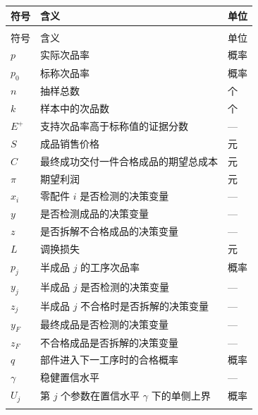 \documentclass[withoutpreface,bwprint]{cumcmthesis}
\numberwithin{equation}{section}
\begin{document}
\begin{longtable}{>{\centering\arraybackslash}p{}>{\centering\arraybackslash}p{}>{\centering\arraybackslash}p{}}

\toprule[1.5pt]
符号 & 含义 & 单位 \\
\midrule[1pt]
\endfirsthead
\multicolumn{3}{c}{\tablename~\thetable{}（续表）} \\
\midrule[1pt]
符号 & 含义 & 单位 \\
\midrule[1pt]
\endhead
\bottomrule[1.5pt]
\endfoot
\noalign{\vspace{-16pt}}
\bottomrule[1.5pt]
\endlastfoot
$p$ & 实际次品率 & 概率 \\
$p_0$ & 标称次品率& 概率 \\
$n$ & 抽样总数 & 个 \\
$k$ & 样本中的次品数 & 个 \\
$E^+$ & 支持次品率高于标称值的证据分数 & --- \\
$S$ & 成品销售价格 & 元 \\
$C$ & 最终成功交付一件合格成品的期望总成本 & 元 \\
$\pi$ & 期望利润 & 元 \\
$x_i$ & 零配件 $i$ 是否检测的决策变量 & --- \\
$y$ & 是否检测成品的决策变量 & --- \\
$z$ & 是否拆解不合格成品的决策变量 & --- \\
$L$ & 调换损失 & 元 \\
$p_j$ & 半成品 $j$ 的工序次品率 & 概率 \\
$y_j$ & 半成品 $j$ 是否检测的决策变量 & --- \\
$z_j$ & 半成品 $j$ 不合格时是否拆解的决策变量 & --- \\
$y_F$ & 最终成品是否检测的决策变量 & --- \\
$z_F$ & 不合格成品是否拆解的决策变量 & --- \\
$q$ & 部件进入下一工序时的合格概率 & 概率 \\
$\gamma$ & 稳健置信水平 & --- \\
$U_j$ & 第 $j$ 个参数在置信水平 $\gamma$ 下的单侧上界 & 概率 \\
\label{tab:符号说明}
\end{longtable}












\end{document}
